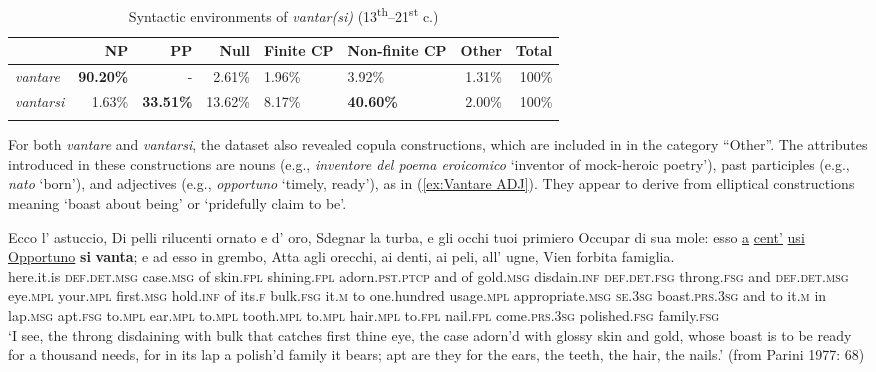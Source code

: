 \documentclass[output=paper,colorlinks,citecolor=brown]{langscibook}
\begin{document}
\begin{table}
\caption{Syntactic environments of \textit{vantar(si)} (13\textsuperscript{th}--21\textsuperscript{st} c.)}
\label{tab:1:vant}
\small
 \begin{tabularx}{\textwidth}{lrrrYYrr}
  \lsptoprule
            & NP & PP & Null & Finite CP & Non-finite CP & Other & Total \\
  \midrule
  \textit{vantare}  &   \textbf{90.20\%}  &    -  &    2.61\%      & 1.96\% & 3.92\%  & 1.31\% & 100\%\\
  \textit{vantarsi}  &   1.63\% &   \textbf{33.51\%}  &    13.62\%     & 8.17\% &   \textbf{40.60\%} & 2.00\% & 100\%\\
  \lspbottomrule
 \end{tabularx}
\end{table}

For both \textit{vantare} and \textit{vantarsi}, the dataset also revealed copula constructions, which are included in  in the category ``Other''. The attributes introduced in these constructions are nouns (e.g., \textit{inventore del poema eroicomico} ‘inventor of mock-heroic poetry’), past participles (e.g., \textit{nato} ‘born’), and adjectives (e.g., \textit{opportuno} ‘timely, ready’), as in (\ref{ex:Vantare ADJ}). They appear to derive from elliptical constructions meaning ‘boast about being’ or ‘pridefully claim to be’.

\begin{exe}
\ex \label{ex:Vantare ADJ}
    \gll Ecco l’ astuccio, Di pelli rilucenti ornato e d’ oro, Sdegnar la turba, e gli occhi tuoi primiero Occupar di sua mole: esso \ul{a} \ul{cent’} \ul{usi} \ul{Opportuno} \textbf{si} \textbf{vanta}; e ad esso in grembo, Atta agli orecchi, ai denti, ai peli, all’ ugne, Vien forbita famiglia.\\
    here.it.is \textsc{def.det.msg} case.\textsc{msg} of skin.\textsc{fpl} shining.\textsc{fpl} adorn.\textsc{pst.ptcp} and of gold.\textsc{msg} disdain.\textsc{inf} \textsc{def.det.fsg} throng.\textsc{fsg} and \textsc{def.det.msg} eye.\textsc{mpl} your.\textsc{mpl} first.\textsc{msg} hold.\textsc{inf} of its.\textsc{f} bulk.\textsc{fsg} it.\textsc{m} to one.hundred usage.\textsc{mpl} appropriate.\textsc{msg} \textsc{se}.\textsc{3sg} boast.\textsc{prs.3sg} and to it.\textsc{m} in lap.\textsc{msg} apt.\textsc{fsg} to.\textsc{mpl} ear.\textsc{mpl} to.\textsc{mpl} tooth.\textsc{mpl} to.\textsc{mpl} hair.\textsc{mpl} to.\textsc{fpl} nail.\textsc{fpl} come.\textsc{prs.3sg} polished.\textsc{fsg} family.\textsc{fsg} \\ 
    \glt ‘I see, the throng disdaining with bulk that catches first thine eye, the case adorn'd with glossy skin and gold, whose boast is to be ready for a thousand needs, for in its lap a polish'd family it bears; apt are they for the ears, the teeth, the hair, the nails.’ (from Parini 1977: 68)
\end{exe}
\end{document}
